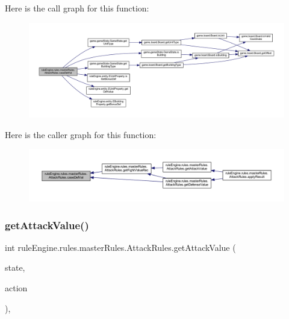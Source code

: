 Here is the call graph for this function\+:
\nopagebreak
\begin{figure}[H]
\begin{center}
\leavevmode
\includegraphics[width=350pt]{classrule_engine_1_1rules_1_1master_rules_1_1_attack_rules_ae5503b7c9d28aa2ca0e242b9c2411b89_cgraph}
\end{center}
\end{figure}
Here is the caller graph for this function\+:
\nopagebreak
\begin{figure}[H]
\begin{center}
\leavevmode
\includegraphics[width=350pt]{classrule_engine_1_1rules_1_1master_rules_1_1_attack_rules_ae5503b7c9d28aa2ca0e242b9c2411b89_icgraph}
\end{center}
\end{figure}
\mbox{\label{classrule_engine_1_1rules_1_1master_rules_1_1_attack_rules_abbf934911508bc5804744745815493d5}} 
\subsubsection{\texorpdfstring{get\+Attack\+Value()}{getAttackValue()}}
{\footnotesize\ttfamily int rule\+Engine.\+rules.\+master\+Rules.\+Attack\+Rules.\+get\+Attack\+Value (\begin{DoxyParamCaption}\item[{\mbox{\hyperlink{classgame_1_1game_state_1_1_game_state}{Game\+State}}}]{state,  }\item[{\mbox{\hyperlink{classrule_engine_1_1_game_action}{Game\+Action}}}]{action }\end{DoxyParamCaption})\hspace{0.3cm}{\ttfamily [inline]}, {\ttfamily [private]}}

